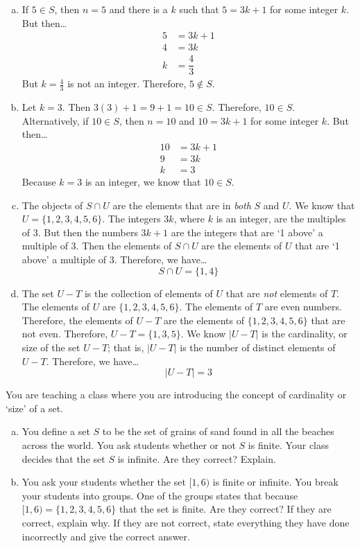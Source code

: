 \documentclass[11pt,letterpaper]{article}
\begin{document}
\sol 
\begin{enumerate}[(a)]
\item If $5 \in S$, then $n= 5$ and there is a $k$ such that $5= 3k + 1$ for some integer $k$. But then\dots
	\[
	\begin{aligned}
	5&= 3k + 1 \\[0.3cm]
	4&= 3k \\[0.3cm]
	k&= \dfrac{4}{3}
	\end{aligned}
	\]
But $k= \frac{4}{3}$ is not an integer. Therefore, $5 \notin S$. \pspace

\item Let $k= 3$. Then $3(3) + 1= 9 + 1= 10 \in S$. Therefore, $10 \in S$. Alternatively, if $10 \in S$, then $n= 10$ and $10= 3k + 1$ for some integer $k$. But then\dots
	\[
	\begin{aligned}
	10&= 3k + 1 \\[0.3cm]
	9&= 3k \\[0.3cm]
	k&= 3
	\end{aligned}
	\]
Because $k= 3$ is an integer, we know that $10 \in S$. \pspace

\item The objects of $S \cap U$ are the elements that are in \textit{both} $S$ and $U$. We know that $U= \{ 1, 2, 3, 4, 5, 6 \}$. The integers $3k$, where $k$ is an integer, are the multiples of 3. But then the numbers $3k + 1$ are the integers that are `1 above' a multiple of 3. Then the elements of $S \cap U$ are the elements of $U$ that are `1 above' a multiple of 3. Therefore, we have\dots
	\[
	S \cap U= \{ 1, 4 \} 
	\]

\item The set $U - T$ is the collection of elements of $U$ that are \textit{not} elements of $T$. The elements of $U$ are $\{ 1, 2, 3, 4, 5, 6 \}$. The elements of $T$ are even numbers. Therefore, the elements of $U - T$ are the elements of $\{ 1, 2, 3, 4, 5, 6 \}$ that are not even. Therefore, $U - T= \{ 1, 3, 5 \}$. We know $|U - T|$ is the cardinality, or size of the set $U - T$; that is, $|U - T|$ is the number of distinct elements of $U - T$. Therefore, we have\dots
	\[
	|U - T|= 3
	\]
\end{enumerate}



\newpage



 You are teaching a class where you are introducing the concept of cardinality or `size' of a set. 
	\begin{enumerate}[(a)]
	\item You define a set $S$ to be the set of grains of sand found in all the beaches across the world. You ask students whether or not $S$ is finite. Your class decides that the set $S$ is infinite. Are they correct? Explain. 
	\item You ask your students whether the set $[1, 6)$ is finite or infinite. You break your students into groups. One of the groups states that because $[1, 6)= \{ 1, 2, 3, 4, 5, 6 \}$ that the set is finite. Are they correct? If they are correct, explain why. If they are not correct, state everything they have done incorrectly and give the correct answer. 
	\end{enumerate} \pspace
\end{document}
